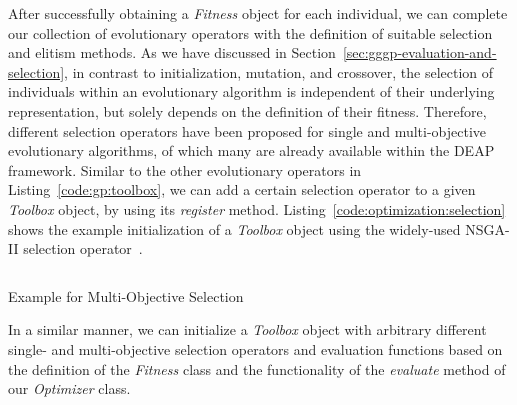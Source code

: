 After successfully obtaining a \emph{Fitness} object for each individual, we can complete our collection of evolutionary operators with the definition of suitable selection and elitism methods.
As we have discussed in Section~\ref{sec:gggp-evaluation-and-selection}, in contrast to initialization, mutation, and crossover, the selection of individuals within an evolutionary algorithm is independent of their underlying representation, but solely depends on the definition of their fitness.
Therefore, different selection operators have been proposed for single and multi-objective evolutionary algorithms, of which many are already available within the DEAP framework.  
Similar to the other evolutionary operators in Listing~\ref{code:gp:toolbox}, we can add a certain selection operator to a given \emph{Toolbox} object, by using its \emph{register} method.
Listing~\ref{code:optimization:selection} shows the example initialization of a \emph{Toolbox} object using the widely-used NSGA-II selection operator~\cite{deb2002fast}. 
\begin{listing}
	\inputminted[linenos]{python}{evostencils/optimization/selection.py}
	\caption{Example for Multi-Objective Selection}
	\label{code:optimization:selection}
\end{listing}
In a similar manner, we can initialize a \emph{Toolbox} object with arbitrary different single- and multi-objective selection operators and evaluation functions based on the definition of the \emph{Fitness} class and the functionality of the \emph{evaluate} method of our \emph{Optimizer} class.

